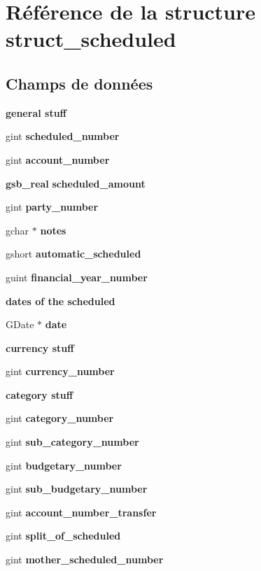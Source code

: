 \section{Référence de la structure struct\_\-scheduled}
\label{structstruct__scheduled}
\subsection*{Champs de données}
\begin{Indent}{\bf general stuff}\par
{\em \label{_amgrp52b07cac44d92ce9f787d506234f1ad4}
 }\begin{DoxyCompactItemize}
\item 
gint {\bf scheduled\_\-number}
\item 
gint {\bf account\_\-number}
\item 
{\bf gsb\_\-real} {\bf scheduled\_\-amount}
\item 
gint {\bf party\_\-number}
\item 
gchar $\ast$ {\bf notes}
\item 
gshort {\bf automatic\_\-scheduled}
\item 
guint {\bf financial\_\-year\_\-number}
\end{DoxyCompactItemize}
\end{Indent}
\begin{Indent}{\bf dates of the scheduled}\par
{\em \label{_amgrp91febf674c1ca204df02d5612a53d0a8}
 }\begin{DoxyCompactItemize}
\item 
GDate $\ast$ {\bf date}
\end{DoxyCompactItemize}
\end{Indent}
\begin{Indent}{\bf currency stuff}\par
{\em \label{_amgrp75d2746ebe83b73f13346d6244b4075d}
 }\begin{DoxyCompactItemize}
\item 
gint {\bf currency\_\-number}
\end{DoxyCompactItemize}
\end{Indent}
\begin{Indent}{\bf category stuff}\par
{\em \label{_amgrp5dd09ca295ac645b7efc407c1a87abab}
 }\begin{DoxyCompactItemize}
\item 
gint {\bf category\_\-number}
\item 
gint {\bf sub\_\-category\_\-number}
\item 
gint {\bf budgetary\_\-number}
\item 
gint {\bf sub\_\-budgetary\_\-number}
\item 
gint {\bf account\_\-number\_\-transfer}
\item 
gint {\bf split\_\-of\_\-scheduled}
\item 
gint {\bf mother\_\-scheduled\_\-number}
\end{DoxyCompactItemize}
\end{Indent}
